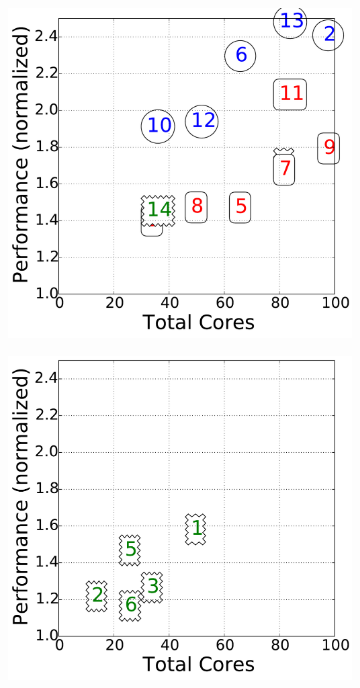 \begin{figure}[!htbp]
\centering
\begin{subfigure}[b]{0.4\textwidth}
    \includegraphics[width=\linewidth]{figures/multiple_bo_cost_hadoop.terasort.bigdata_12_cores.pdf}
    \caption{\cherrypick}
    \label{fig:search_cost_cherrypick}
\end{subfigure}
\begin{subfigure}[b]{0.4\textwidth}
    \includegraphics[width=\linewidth]{figures/multiple_scout_cost_hadoop.terasort.bigdata_24_m4.large_cores.pdf}

\end{subfigure}
\end{figure}
